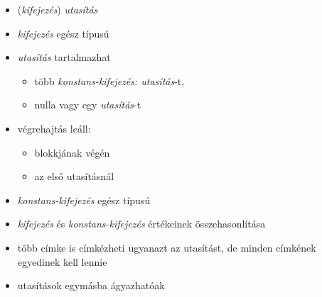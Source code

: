 \documentclass[usenames,dvipsnames,aspectratio=169]{beamer}
\begin{document}
\begin{frame}
  \begin{itemize}
    \item {}(\emph{kifejezés}) \emph{utasítás}
    \item \emph{kifejezés} egész típusú
    \item \emph{utasítás} tartalmazhat
    \begin{itemize}
      \item több  \emph{konstans-kifejezés: utasítás}-t,
      \item nulla vagy egy  \emph{utasítás}-t
    \end{itemize}
    \item végrehajtás leáll:
    \begin{itemize}
      \item {} blokkjának végén
      \item az első  utasításnál
    \end{itemize}
    \item \emph{konstans-kifejezés} egész típusú
    \item \emph{kifejezés} és \emph{konstans-kifejezés} értékeinek összehasonlítása
    \item több  címke is címkézheti ugyanazt az utasítást, de minden 
címkének egyedinek kell lennie
    \item {} utasítások egymásba ágyazhatóak
  \end{itemize}
\end{frame}
\end{document}

